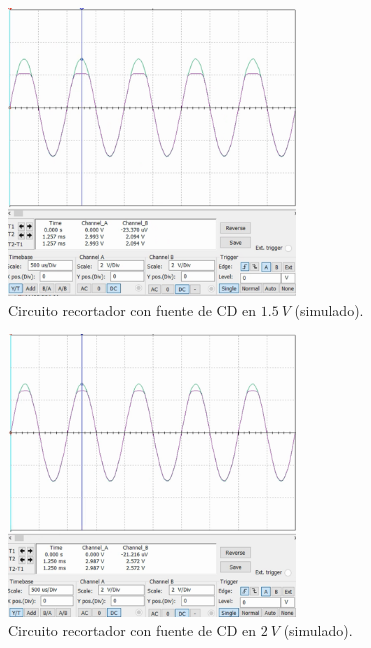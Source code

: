 \documentclass[journal]{IEEEtran}
\begin{document}
\begin{figure}[H]
        \centering
        \includegraphics[width=3in]{SignalSimulated_08.png}
        \caption{Circuito recortador con fuente de CD en $1.5~V$ (simulado).}
        \label{fig:SignalSimulated_08}
\end{figure}
\begin{figure}[H]
        \centering
        \includegraphics[width=3in]{SignalSimulated_09.png}
        \caption{Circuito recortador con fuente de CD en $2~V$ (simulado).}
        \label{fig:SignalSimulated_09}
\end{figure}
\end{document}
